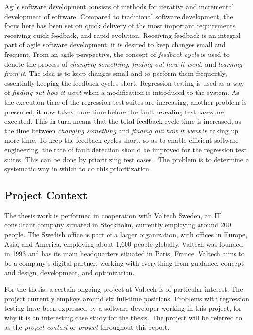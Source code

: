 \documentclass[a4paper,english,12pt]{report}
\begin{document}
Agile software development consists of methods for iterative and incremental development of software. Compared to traditional software development, the focus here has been set on quick delivery of the most important requirements, receiving quick feedback, and rapid evolution. \citep{leffingwell2007scaling} Receiving feedback is an integral part of agile software development; it is desired to keep changes small and frequent. From an agile perspective, the concept of \emph{feedback cycle} is used to denote the process of \textit{changing something}, \textit{finding out how it went}, and \textit{learning from it}. The idea is to keep changes small and to perform them frequently, essentially keeping the feedback cycles short. \citep[pp. 18-19]{kniberg2010kanban} Regression testing is used as a way of \textit{finding out how it went} when a modification is introduced to the system. As the execution time of the regression test suites are increasing, another problem is presented; it now takes more time before the fault revealing test cases are executed. This in turn means that the total feedback cycle time is increased, as the time between \textit{changing something} and \textit{finding out how it went} is taking up more time. To keep the feedback cycles short, so as to enable efficient software engineering, the rate of fault detection should be improved for the regression test suites. This can be done by prioritizing test cases \citep{yoo2012regression}. The problem is to determine a systematic way in which to do this prioritization.

\subsection{Project Context}
The thesis work is performed in cooperation with Valtech Sweden, an IT consultant company situated in Stockholm, currently employing around 200 people. The Swedish office is part of a larger organization, with offices in Europe, Asia, and America, employing about 1,600 people globally. Valtech was founded in 1993 and has its main headquarters situated in Paris, France. Valtech aims to be a company's digital partner, working with everything from guidance, concept and design, development, and optimization.

For the thesis, a certain ongoing project at Valtech is of particular interest. The project currently employs around six full-time positions. Problems with regression testing have been expressed by a software developer working in this project, for why it is an interesting case study for the thesis. The project will be referred to as the \emph{project context} or \emph{project} throughout this report.
\end{document}
